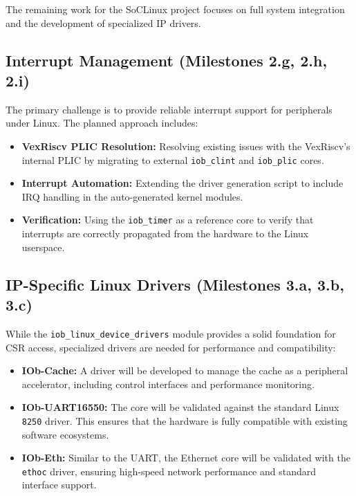 %

The remaining work for the SoCLinux project focuses on full system integration and the development of specialized IP drivers.

\subsection{Interrupt Management (Milestones 2.g, 2.h, 2.i)}
The primary challenge is to provide reliable interrupt support for peripherals under Linux. The planned approach includes:
\begin{itemize}
    \item \textbf{VexRiscv PLIC Resolution:} Resolving existing issues with the VexRiscv's internal PLIC by migrating to external \texttt{iob\_clint} and \texttt{iob\_plic} cores.
    \item \textbf{Interrupt Automation:} Extending the driver generation script to include IRQ handling in the auto-generated kernel modules.
    \item \textbf{Verification:} Using the \texttt{iob\_timer} as a reference core to verify that interrupts are correctly propagated from the hardware to the Linux userspace.
\end{itemize}

\subsection{IP-Specific Linux Drivers (Milestones 3.a, 3.b, 3.c)}
While the \texttt{iob\_linux\_device\_drivers} module provides a solid foundation for CSR access, specialized drivers are needed for performance and compatibility:
\begin{itemize}
    \item \textbf{IOb-Cache:} A driver will be developed to manage the cache as a peripheral accelerator, including control interfaces and performance monitoring.
    \item \textbf{IOb-UART16550:} The core will be validated against the standard Linux \texttt{8250} driver. This ensures that the hardware is fully compatible with existing software ecosystems.
    \item \textbf{IOb-Eth:} Similar to the UART, the Ethernet core will be validated with the \texttt{ethoc} driver, ensuring high-speed network performance and standard interface support.
\end{itemize}
